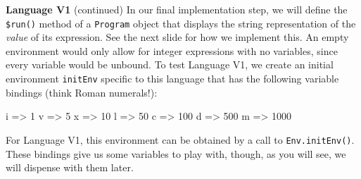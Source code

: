 \begin{minipage}[t]{\sw}
\slidenumber
\LARGE
{\bf Language V1} (continued)\exx
In our final implementation step,
we will define the \verb'$run()' method
of a \verb'Program' object that displays
the string representation of the {\em value} of its expression.
See the next slide for how we implement this.\exx
An empty environment would only allow for integer expressions
with no variables, since every variable would be unbound.
To test Language V1, we create an initial environment \verb'initEnv'
specific to this language that has the following variable bindings
(think Roman numerals!):
\begin{qv}
i => 1
v => 5
x => 10
l => 50
c => 100
d => 500
m => 1000
\end{qv}
For Language V1, this environment can be obtained
by a call to \verb'Env.initEnv()'.
These bindings give us some variables to play with,
though, as you will see, we will dispense with them later.\exx
\end{minipage}
\clearpage
